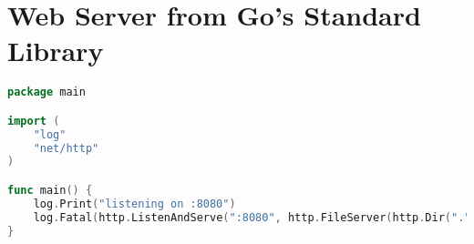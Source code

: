 \chapter{Web Server from Go's Standard Library}
\label{chap:appendix_golangwebserver}

\begin{lstlisting}[language=Go]
package main

import (
    "log"
    "net/http"
)

func main() {
    log.Print("listening on :8080")
    log.Fatal(http.ListenAndServe(":8080", http.FileServer(http.Dir("."))))
}
\end{lstlisting}

